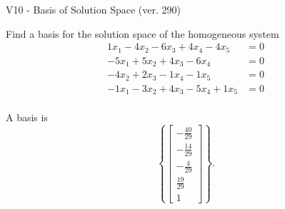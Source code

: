 \begin{exercise}
  \begin{exerciseTitle}V10 - Basis of Solution Space (ver. 290)\end{exerciseTitle}
  \begin{exerciseStatement}
    Find a basis for the solution space of the homogeneous system 
\begin{align*}
 1 x_ 1 -4 x_ 2 -6 x_ 3 + 4 x_ 4 -4 x_ 5 &= 0  \\ 
  -5 x_ 1 + 5 x_ 2 + 4 x_ 3 -6 x_ 4 &= 0  \\ 
  -4 x_ 2 + 2 x_ 3 -1 x_ 4 -1 x_ 5 &= 0  \\ 
  -1 x_ 1 -3 x_ 2 + 4 x_ 3 -5 x_ 4 + 1 x_ 5 &= 0  \\ 
 \end{align*}


 
  \end{exerciseStatement}

  \begin{exerciseAnswer}
   A basis is   
\[\left\{\left[\begin{array}{c}
-\frac{40}{29} \\
-\frac{14}{29} \\
-\frac{4}{29} \\
\frac{19}{29} \\
1
\end{array}\right]\right\}.\]

  


  \end{exerciseAnswer}
\end{exercise}